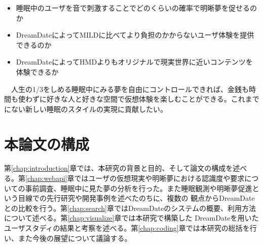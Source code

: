 \begin{itemize}
\item 睡眠中のユーザを音で刺激することでどのくらいの確率で明晰夢を促せるのか
\item DreamDateによってMILDに比べてより負担のかからないユーザ体験を提供できるのか
\item DreamDateによってHMDよりもオリジナルで現実世界に近いコンテンツを体験できるか
\end{itemize}

　人生の1/3をしめる睡眠中にみる夢を自由にコントロールできれば、金銭も時間も使わずに好きな人と好きな空間で仮想体験を楽しむことができる。これまでにない新しい睡眠のスタイルの実現に貢献したい。

\section{本論文の構成}
第\ref{chap:introduction}章では、本研究の背景と目的、そして論文の構成を述べる。第\ref{chap:webapi}章ではユーザの仮想現実や明晰夢における認識度や要求についての事前調査、睡眠中に見た夢の分析を行った。また睡眠観測や明晰夢促進という目線での先行研究や開発事例を述べたのちに、複数の 観点からDreamDateとの比較を行う。第\ref{chap:search}章ではDreamDateのシステムの概要、利用方法 について述べる。第\ref{chap:visualize}章では本研究で構築した DreamDateを用いたユーザスタディの結果と考察を述べる。第\ref{chap:coding}章では本研究の総括を行い、また今後の展望について議論する。
